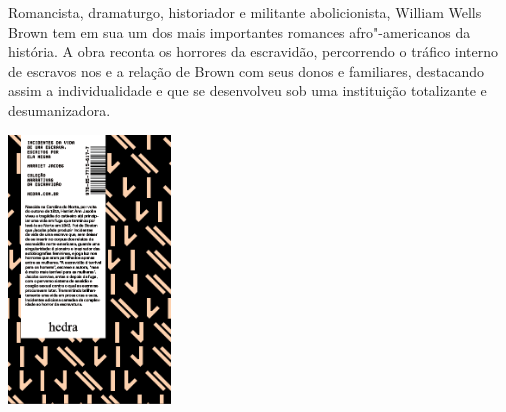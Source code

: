 \hspace*{-7cm}\hrulefill\hspace*{-7cm}

\medskip

\noindent{}Romancista, dramaturgo, historiador e militante abolicionista, William Wells Brown tem em sua {} um dos mais importantes romances afro"-americanos da história. A obra reconta os horrores da escravidão, percorrendo o tráfico interno de escravos nos  e a relação de Brown com seus donos e familiares, destacando assim a individualidade e que se desenvolveu sob uma instituição totalizante e desumanizadora.

\vfill

\hspace*{-.4cm}\begin{minipage}[c]{1\linewidth}
\small{
{}}
\end{minipage}

\pagebreak

\hspace{.5cm}

\begin{center}
\hspace*{-.5cm}\includegraphics[width=43mm]{./imgs/jacobs.png}
\end{center}

